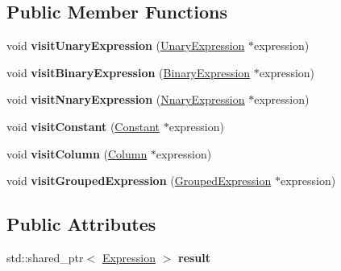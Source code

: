 \subsection*{Public Member Functions}
\begin{DoxyCompactItemize}
\item 
\hypertarget{class_cloning_expression_visitor_a5eef4362b38190ddadda4c3a6c530475}{void {\bfseries visit\+Unary\+Expression} (\hyperlink{class_unary_expression}{Unary\+Expression} $\ast$expression)}\label{class_cloning_expression_visitor_a5eef4362b38190ddadda4c3a6c530475}

\item 
\hypertarget{class_cloning_expression_visitor_a6a7ba77a1e2b18837d5968d8c9c6e1bc}{void {\bfseries visit\+Binary\+Expression} (\hyperlink{class_binary_expression}{Binary\+Expression} $\ast$expression)}\label{class_cloning_expression_visitor_a6a7ba77a1e2b18837d5968d8c9c6e1bc}

\item 
\hypertarget{class_cloning_expression_visitor_ac09c5ce926f720992e6799b39625fbc2}{void {\bfseries visit\+Nnary\+Expression} (\hyperlink{class_nnary_expression}{Nnary\+Expression} $\ast$expression)}\label{class_cloning_expression_visitor_ac09c5ce926f720992e6799b39625fbc2}

\item 
\hypertarget{class_cloning_expression_visitor_af88937b26b66507f653a0370f51e2fa1}{void {\bfseries visit\+Constant} (\hyperlink{class_constant}{Constant} $\ast$expression)}\label{class_cloning_expression_visitor_af88937b26b66507f653a0370f51e2fa1}

\item 
\hypertarget{class_cloning_expression_visitor_aae3630ba345d058f2b1be2ae6c83340c}{void {\bfseries visit\+Column} (\hyperlink{class_column}{Column} $\ast$expression)}\label{class_cloning_expression_visitor_aae3630ba345d058f2b1be2ae6c83340c}

\item 
\hypertarget{class_cloning_expression_visitor_af5bd6b26028188a7a582a2236342e339}{void {\bfseries visit\+Grouped\+Expression} (\hyperlink{class_grouped_expression}{Grouped\+Expression} $\ast$expression)}\label{class_cloning_expression_visitor_af5bd6b26028188a7a582a2236342e339}

\end{DoxyCompactItemize}
\subsection*{Public Attributes}
\begin{DoxyCompactItemize}
\item 
\hypertarget{class_cloning_expression_visitor_aa23b5af5203ff9b14ee556a527173ad3}{std\+::shared\+\_\+ptr$<$ \hyperlink{class_expression}{Expression} $>$ {\bfseries result}}\label{class_cloning_expression_visitor_aa23b5af5203ff9b14ee556a527173ad3}

\end{DoxyCompactItemize}


